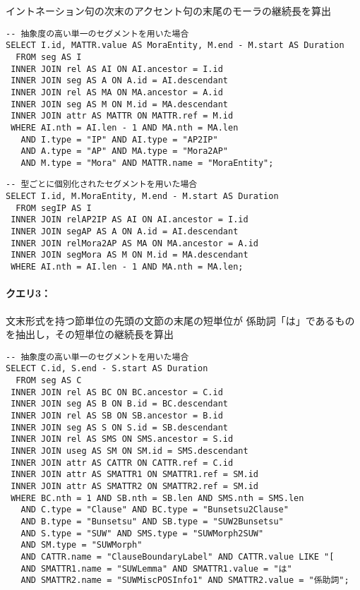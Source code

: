 \documentclass[japanese]{jnlp_1.4}
\begin{document}
イントネーション句の次末のアクセント句の末尾のモーラの継続長を算出

\begin{screen}\small
\renewcommand\baselinestretch{0.8}
\begin{verbatim}
-- 抽象度の高い単一のセグメントを用いた場合
SELECT I.id, MATTR.value AS MoraEntity, M.end - M.start AS Duration
  FROM seg AS I
 INNER JOIN rel AS AI ON AI.ancestor = I.id
 INNER JOIN seg AS A ON A.id = AI.descendant
 INNER JOIN rel AS MA ON MA.ancestor = A.id
 INNER JOIN seg AS M ON M.id = MA.descendant
 INNER JOIN attr AS MATTR ON MATTR.ref = M.id
 WHERE AI.nth = AI.len - 1 AND MA.nth = MA.len
   AND I.type = "IP" AND AI.type = "AP2IP"
   AND A.type = "AP" AND MA.type = "Mora2AP"
   AND M.type = "Mora" AND MATTR.name = "MoraEntity";
\end{verbatim}
\end{screen}

\begin{screen}\small
\renewcommand\baselinestretch{0.8}
\begin{verbatim}
-- 型ごとに個別化されたセグメントを用いた場合
SELECT I.id, M.MoraEntity, M.end - M.start AS Duration
  FROM segIP AS I
 INNER JOIN relAP2IP AS AI ON AI.ancestor = I.id
 INNER JOIN segAP AS A ON A.id = AI.descendant
 INNER JOIN relMora2AP AS MA ON MA.ancestor = A.id
 INNER JOIN segMora AS M ON M.id = MA.descendant
 WHERE AI.nth = AI.len - 1 AND MA.nth = MA.len;
\end{verbatim}
\end{screen}

\vspace{.5\baselineskip}
\clearpage
\paragraph{クエリ3：}

文末形式を持つ節単位の先頭の文節の末尾の短単位が
係助詞「は」であるものを抽出し，その短単位の継続長を算出

\begin{screen}\small
\renewcommand\baselinestretch{0.8}
\begin{verbatim}
-- 抽象度の高い単一のセグメントを用いた場合
SELECT C.id, S.end - S.start AS Duration
  FROM seg AS C
 INNER JOIN rel AS BC ON BC.ancestor = C.id
 INNER JOIN seg AS B ON B.id = BC.descendant
 INNER JOIN rel AS SB ON SB.ancestor = B.id
 INNER JOIN seg AS S ON S.id = SB.descendant
 INNER JOIN rel AS SMS ON SMS.ancestor = S.id
 INNER JOIN useg AS SM ON SM.id = SMS.descendant
 INNER JOIN attr AS CATTR ON CATTR.ref = C.id
 INNER JOIN attr AS SMATTR1 ON SMATTR1.ref = SM.id
 INNER JOIN attr AS SMATTR2 ON SMATTR2.ref = SM.id
 WHERE BC.nth = 1 AND SB.nth = SB.len AND SMS.nth = SMS.len
   AND C.type = "Clause" AND BC.type = "Bunsetsu2Clause"
   AND B.type = "Bunsetsu" AND SB.type = "SUW2Bunsetsu"
   AND S.type = "SUW" AND SMS.type = "SUWMorph2SUW"
   AND SM.type = "SUWMorph"
   AND CATTR.name = "ClauseBoundaryLabel" AND CATTR.value LIKE "[
   AND SMATTR1.name = "SUWLemma" AND SMATTR1.value = "は"
   AND SMATTR2.name = "SUWMiscPOSInfo1" AND SMATTR2.value = "係助詞";
\end{verbatim}
\end{screen}
\end{document}
